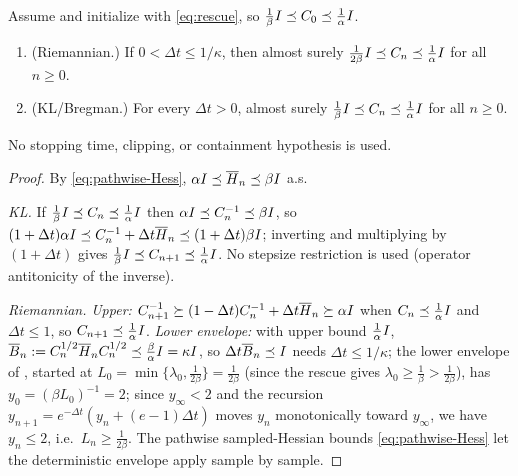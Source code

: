 \begin{lemma}
\label{lem:stoch-band}
Assume  and initialize with \eqref{eq:rescue}, so
$\tfrac1\beta I\preceq C_0\preceq\tfrac1\alpha I$.
\begin{enumerate}
\item \textup{(Riemannian.)} If $0<\Delta t\leq1/\kappa$, then almost surely
$\tfrac1{2\beta}I\preceq C_n\preceq\tfrac1\alpha I$ for all $n\geq0$.
\item \textup{(KL/Bregman.)} For every $\Delta t>0$, almost surely
$\tfrac1\beta I\preceq C_n\preceq\tfrac1\alpha I$ for all $n\geq0$.
\end{enumerate}
No stopping time, clipping, or containment hypothesis is used.
\end{lemma}

\begin{proof}
By \eqref{eq:pathwise-Hess}, $\alpha I\preceq\overline H_n\preceq\beta I$ a.s.

\emph{KL.} If $\tfrac1\beta I\preceq C_n\preceq\tfrac1\alpha I$ then $\alpha I\preceq C_n^{-1}\preceq\beta I$,
so $(1+\Delta t)\alpha I\preceq C_n^{-1}+\Delta t\overline H_n\preceq(1+\Delta t)\beta I$; inverting
and multiplying by $(1+\Delta t)$ gives $\tfrac1\beta I\preceq C_{n+1}\preceq\tfrac1\alpha I$. No
stepsize restriction is used (operator antitonicity of the inverse).

\emph{Riemannian.} \emph{Upper:} $C_{n+1}^{-1}\succeq(1-\Delta t)C_n^{-1}+\Delta t\overline H_n\succeq\alpha I$
when $C_n\preceq\tfrac1\alpha I$ and $\Delta t\leq1$, so $C_{n+1}\preceq\tfrac1\alpha I$.
\emph{Lower envelope:} with upper bound $\tfrac1\alpha I$, $\overline B_n:=C_n^{1/2}\overline H_nC_n^{1/2}\preceq\tfrac\beta\alpha I=\kappa I$,
so $\Delta t\overline B_n\preceq I$ needs $\Delta t\leq1/\kappa$; the lower envelope of
, started at $L_0=\min\{\lambda_0,\tfrac1{2\beta}\}=\tfrac1{2\beta}$ (since the
rescue gives $\lambda_0\geq\tfrac1\beta>\tfrac1{2\beta}$), has $y_0=(\beta L_0)^{-1}=2$; since
$y_\infty<2$ and the recursion $y_{n+1}=e^{-\Delta t}(y_n+(e-1)\Delta t)$ moves $y_n$ monotonically
toward $y_\infty$, we have $y_n\leq2$, i.e.\ $L_n\geq\tfrac1{2\beta}$. The pathwise sampled-Hessian
bounds \eqref{eq:pathwise-Hess} let the deterministic envelope apply sample by sample.
\end{proof}


